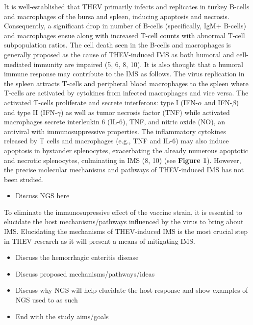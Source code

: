 \documentclass[
]{article}
\providecommand{\tightlist}{%
  \setlength{\itemsep}{0pt}\setlength{\parskip}{0pt}}
\begin{document}
It is well-established that THEV primarily infects and replicates in
turkey B-cells and macrophages of the bursa and spleen, inducing
apoptosis and necrosis. Consequently, a significant drop in number of
B-cells (specifically, IgM+ B-cells) and macrophages ensue along with
increased T-cell counts with abnormal T-cell subpopulation ratios. The
cell death seen in the B-cells and macrophages is generally proposed as
the cause of THEV-induced IMS as both humoral and cell-mediated immunity
are impaired (5, 6, 8, 10). It is also thought that a humoral immune
response may contribute to the IMS as follows. The virus replication in
the spleen attracts T-cells and peripheral blood macrophages to the
spleen where T-cells are activated by cytokines from infected
macrophages and vice versa. The activated T-cells proliferate and
secrete interferons: type I (IFN-\(\alpha\) and IFN-\(\beta\)) and type
II (IFN-\(\gamma\)) as well as tumor necrosis factor (TNF) while
activated macrophages secrete interleukin 6 (IL-6), TNF, and nitric
oxide (NO), an antiviral with immunosuppressive properties. The
inflammatory cytokines released by T cells and macrophages (e.g., TNF
and IL-6) may also induce apoptosis in bystander splenocytes,
exacerbating the already numerous apoptotic and necrotic splenocytes,
culminating in IMS (8, 10) (see \textbf{Figure 1}). However, the precise
molecular mechanisms and pathways of THEV-induced IMS has not been
studied.

\begin{itemize}
\tightlist
\item
  Discuss NGS here
\end{itemize}

To eliminate the immunosupressive effect of the vaccine strain, it is
essential to elucidate the host mechanisms/pathways influenced by the
virus to bring about IMS. Elucidating the mechanisms of THEV-induced IMS
is the most crucial step in THEV research as it will present a means of
mitigating IMS.

\begin{itemize}
\tightlist
\item
  Discuss the hemorrhagic enteritis disease
\item
  Discuss proposed mechanisms/pathways/ideas
\item
  Discuss why NGS will help elucidate the host response and show
  examples of NGS used to as such
\item
  End with the study aims/goals
\end{itemize}
\end{document}
